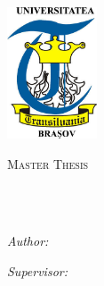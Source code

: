 \documentclass[
11pt, %
english, %
singlespacing, %
oneside,
headsepline, %
]{MastersDoctoralThesis} %
\author{Bogdan Alexandru \textsc{Lupu}} %
\begin{document}
\frontmatter %

\pagestyle{plain} %


\begin{titlepage}
\begin{center}
\includegraphics[width=0.2\textwidth]{images/unilogo.jpg}\\[0.5cm]
{\scshape\LARGE \univname\par}\vspace{1.5cm} %
\textsc{\Large Master Thesis}\\[0.5cm] %

\HRule \\[0.4cm] %
{\huge \bfseries \ttitle\par}\vspace{0.4cm} %
\HRule \\[1.5cm] %

\begin{minipage}[t]{0.4\textwidth}
\begin{flushleft} \large
\emph{Author:}\\
\authorname %
\end{flushleft}
\end{minipage}
\begin{minipage}[t]{0.4\textwidth}
\begin{flushright} \large
\emph{Supervisor:} \\
\supname %
\end{flushright}
\end{minipage}\\[3cm]


\end{center}
\end{titlepage}
\end{document}

